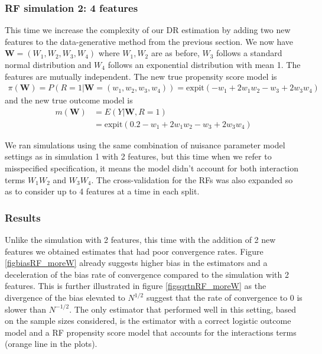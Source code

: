 \documentclass[12pt,twoside]{article}
\newcommand{\expit}{\text{expit}}
\begin{document}
\clearpage
\subsubsection{RF simulation 2: 4 features}

This time we increase the complexity of our DR estimation by adding two new features to the data-generative method from the previous section. We now have $\mathbf{W} = (W_1,W_2,W_3,W_4)$ where $W_1,W_2$ are as before, $W_3$ follows a standard normal distribution and $W_4$ follows an exponential distribution with mean 1. The features are mutually independent. The new true propensity score model is 
\begin{align*}
    \pi(\mathbf{W}) = P(R = 1 |\mathbf{W} = (w_1,w_2, w_3,w_4)) = \expit(-w_1 + 2w_1w_2 - w_3 + 2w_3w_4)
\end{align*}
and the new true outcome model is 
\begin{align*}
    m(\mathbf{W}) &= E(Y|\mathbf{W}, R=1) \\
    & = \expit(0.2 - w_1 + 2w_1w_2 - w_3 + 2w_3w_4)
\end{align*}

We ran simulations using the same combination of nuisance parameter model settings as in simulation 1 with 2 features, but this time when we refer to misspecified specification, it means the model didn't account for both interaction terms $W_1W_2$ and $W_3W_4$. The cross-validation for the RFs was also expanded so as to consider up to 4 features at a time in each split. 

\subsubsection*{Results}

Unlike the simulation with 2 features, this time with the addition of 2 new features we obtained estimates that had poor convergence rates. Figure \ref{figbiasRF_moreW} already suggests higher bias in the estimators and a deceleration of the bias rate of convergence compared to the simulation with 2 features. This is further illustrated in figure \ref{figsqrtnRF_moreW} as the divergence of the bias elevated to $N^{1/2}$ suggest that the rate of convergence to 0 is slower than $N^{-1/2}$. The only estimator that performed well in this setting, based on the sample sizes considered, is the estimator with a correct logistic outcome model and a RF propensity score model that accounts for the interactions terms (orange line in the plots). 
\end{document}
